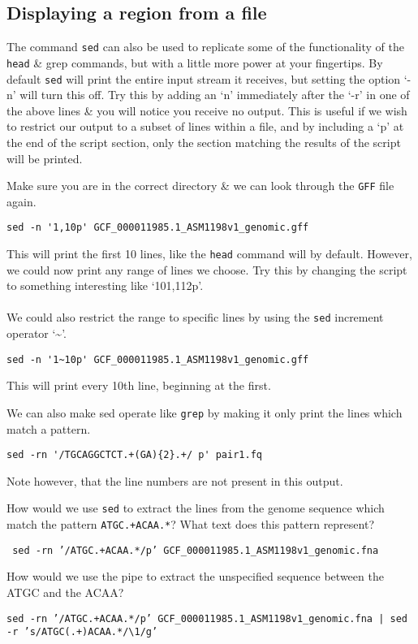 \subsection*{Displaying a region from a file}
The command \texttt{sed} can also be used to replicate some of the functionality of the \texttt{head} \& grep commands, but with a little more power at your fingertips.
By default \texttt{sed} will print the entire input stream it receives, but setting the option `-n' will turn this off.
Try this by adding an `n' immediately after the `-r' in one of the above lines \& you will notice you receive no output.
This is useful if we wish to restrict our output to a subset of lines within a file, and by including a `p' at the end of the script section, only the section matching the results of the script will be printed.
\begin{steps}
Make sure you are in the correct directory \& we can look through the \texttt{GFF} file again.
\begin{lstlisting}
sed -n '1,10p' GCF_000011985.1_ASM1198v1_genomic.gff
\end{lstlisting}
This will print the first 10 lines, like the \texttt{head} command will by default.
However, we could now print any range of lines we choose.
Try this by changing the script to something interesting like `101,112p'.\\
\\
We could also restrict the range to specific lines by using the \texttt{sed} increment operator `\~{}'.
\begin{lstlisting}
sed -n '1~10p' GCF_000011985.1_ASM1198v1_genomic.gff
\end{lstlisting}
This will print every 10th line, beginning at the first.
\end{steps}

\begin{steps}
We can also make sed operate like \texttt{grep} by making it only print the lines which match a pattern.
\begin{lstlisting}
sed -rn '/TGCAGGCTCT.+(GA){2}.+/ p' pair1.fq
\end{lstlisting}
Note however, that the line numbers are not present in this output.
\end{steps}

\begin{questions}
How would we use \texttt{sed} to extract the lines from the genome sequence which match the pattern \texttt{ATGC.+ACAA.*}? What text does this pattern represent?\\
\begin{answer}
\texttt{ sed -rn '/ATGC.+ACAA.*/p' GCF\_000011985.1\_ASM1198v1\_genomic.fna}\\
\end{answer}
How would we use the pipe to extract the unspecified sequence between the ATGC and the ACAA?\\
\begin{answer}
\texttt{sed -rn '/ATGC.+ACAA.*/p' GCF\_000011985.1\_ASM1198v1\_genomic.fna | sed -r 's/ATGC(.+)ACAA.*/\textbackslash 1/g'
}
\end{answer}
\end{questions}

